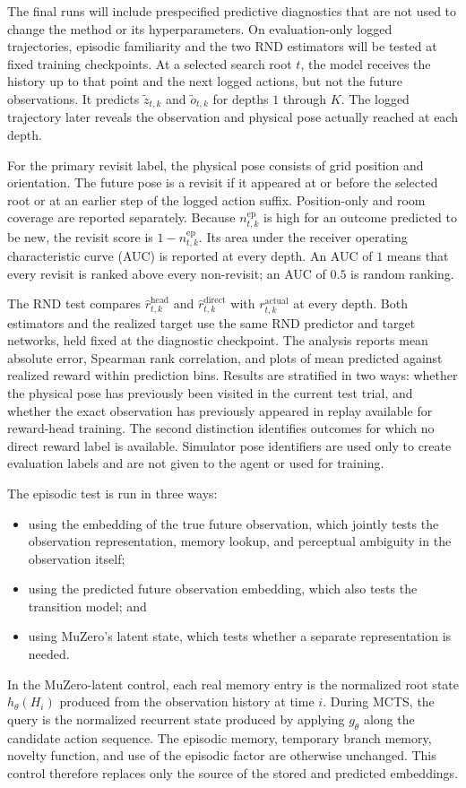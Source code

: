 \documentclass{article}
\begin{document}
The final runs will include prespecified predictive diagnostics that are not
used to change the method or its hyperparameters. On evaluation-only logged
trajectories, episodic familiarity and the two RND estimators will be tested at
fixed training checkpoints. At a selected search root $t$, the model receives
the history up to that point and the next logged actions, but not the future
observations. It predicts $\tilde z_{t,k}$ and $\tilde o_{t,k}$ for depths $1$
through $K$. The logged trajectory later reveals the observation and physical
pose actually reached at each depth.

For the primary revisit label, the physical pose consists of grid position and
orientation. The future pose is a revisit if it appeared at or before the
selected root or at an earlier step of the logged action suffix. Position-only
and room coverage are reported separately. Because
$n^{\mathrm{ep}}_{t,k}$ is high for an outcome predicted to be new, the revisit
score is $1-n^{\mathrm{ep}}_{t,k}$. Its area under the receiver operating
characteristic curve (AUC) is reported at every depth. An AUC of $1$ means that
every revisit is ranked above every non-revisit; an AUC of $0.5$ is random
ranking.

The RND test compares $\hat r^{\mathrm{head}}_{t,k}$ and
$\hat r^{\mathrm{direct}}_{t,k}$ with
$r^{\mathrm{actual}}_{t,k}$ at every depth. Both estimators and the realized
target use the same RND predictor and target networks, held fixed at the
diagnostic checkpoint. The analysis reports mean absolute error, Spearman rank
correlation, and plots of mean predicted against realized reward within
prediction bins. Results are stratified in two ways: whether the physical pose
has previously been visited in the current test trial, and whether the exact
observation has previously appeared in replay available for reward-head
training. The second distinction identifies outcomes for which no direct reward
label is available. Simulator pose identifiers are used only to create
evaluation labels and are not given to the agent or used for training.

The episodic test is run in three ways:
\begin{itemize}
    \item using the embedding of the true future observation, which jointly
    tests the observation representation, memory lookup, and perceptual
    ambiguity in the observation itself;
    \item using the predicted future observation embedding, which also tests
    the transition model; and
    \item using MuZero's latent state, which tests whether a separate
    representation is needed.
\end{itemize}
In the MuZero-latent control, each real memory entry is the normalized root
state $h_\theta(H_i)$ produced from the observation history at time $i$. During
MCTS, the query is the normalized recurrent state produced by applying
$g_\theta$ along the candidate action sequence. The episodic memory, temporary
branch memory, novelty function, and use of the episodic factor are otherwise
unchanged. This control therefore replaces only the source of the stored and
predicted embeddings.
\end{document}
